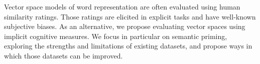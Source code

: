 Vector space models of word representation are often evaluated using human similarity ratings. Those ratings are elicited in explicit tasks and have well-known subjective biases. As an alternative, we propose evaluating vector spaces using implicit cognitive measures. We focus in particular on semantic priming, exploring the strengths and limitations of existing datasets, and propose ways in which those datasets can be improved.
